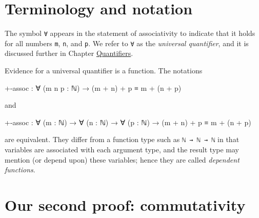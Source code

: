 \begin{fence}
\begin{code}
\\
%
\>[6]\<%
\\
\>[6][@{}l@{\AgdaIndent{0}}]%
\>[8]\AgdaSpace{}%
\AgdaOperator{\AgdaPrimitive{+}}\AgdaSpace{}%
\<%
\\
%
\>[6]\<%
\\
\>[6][@{}l@{\AgdaIndent{0}}]%
\>[8]\AgdaSpace{}%
\AgdaOperator{\AgdaPrimitive{+}}\AgdaSpace{}%
\AgdaSymbol{(}\AgdaSpace{}%
\AgdaOperator{\AgdaPrimitive{+}}\AgdaSpace{}%
\AgdaSymbol{)}\<%
\\
%
\>[6]\<%
\end{code}
\end{fence}

\hypertarget{terminology-and-notation}{%
\section{Terminology and notation}\label{terminology-and-notation}}

The symbol \texttt{∀} appears in the statement of associativity to
indicate that it holds for all numbers \texttt{m}, \texttt{n}, and
\texttt{p}. We refer to \texttt{∀} as the \emph{universal quantifier},
and it is discussed further in Chapter
\protect\hyperlink{Quantifiers}{Quantifiers}.

Evidence for a universal quantifier is a function. The notations

\begin{myDisplay}
+-assoc : ∀ (m n p : ℕ) → (m + n) + p ≡ m + (n + p)
\end{myDisplay}

and

\begin{myDisplay}
+-assoc : ∀ (m : ℕ) → ∀ (n : ℕ) → ∀ (p : ℕ) → (m + n) + p ≡ m + (n + p)
\end{myDisplay}

are equivalent. They differ from a function type such as
\texttt{ℕ\ →\ ℕ\ →\ ℕ} in that variables are associated with each
argument type, and the result type may mention (or depend upon) these
variables; hence they are called \emph{dependent functions}.

\hypertarget{our-second-proof-commutativity}{%
\section{Our second proof:
commutativity}\label{our-second-proof-commutativity}}

